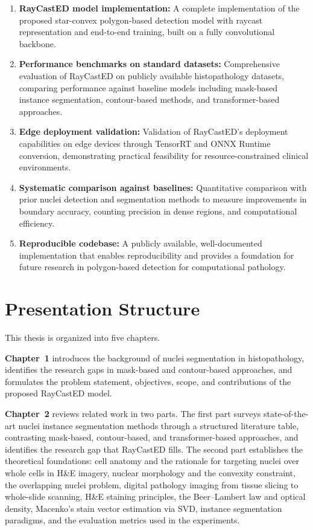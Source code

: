 \begin{enumerate}
	\item \textbf{RayCastED model implementation:} A complete implementation of the proposed star-convex polygon-based detection model with raycast representation and end-to-end training, built on a fully convolutional backbone.

	\item \textbf{Performance benchmarks on standard datasets:} Comprehensive evaluation of RayCastED on publicly available histopathology datasets, comparing performance against baseline models including mask-based instance segmentation, contour-based methods, and transformer-based approaches.

	\item \textbf{Edge deployment validation:} Validation of RayCastED's deployment capabilities on edge devices through TensorRT and ONNX Runtime conversion, demonstrating practical feasibility for resource-constrained clinical environments.

	\item \textbf{Systematic comparison against baselines:} Quantitative comparison with prior nuclei detection and segmentation methods to measure improvements in boundary accuracy, counting precision in dense regions, and computational efficiency.

	\item \textbf{Reproducible codebase:} A publicly available, well-documented implementation that enables reproducibility and provides a foundation for future research in polygon-based detection for computational pathology.
\end{enumerate}

\section{Presentation Structure}

This thesis is organized into five chapters.

\textbf{Chapter~1} introduces the background of nuclei segmentation in histopathology, identifies the research gaps in mask-based and contour-based approaches, and formulates the problem statement, objectives, scope, and contributions of the proposed RayCastED model.

\textbf{Chapter~2} reviews related work in two parts. The first part surveys state-of-the-art nuclei instance segmentation methods through a structured literature table, contrasting mask-based, contour-based, and transformer-based approaches, and identifies the research gap that RayCastED fills. The second part establishes the theoretical foundations: cell anatomy and the rationale for targeting nuclei over whole cells in H\&E imagery, nuclear morphology and the convexity constraint, the overlapping nuclei problem, digital pathology imaging from tissue slicing to whole-slide scanning, H\&E staining principles, the Beer--Lambert law and optical density, Macenko's stain vector estimation via SVD, instance segmentation paradigms, and the evaluation metrics used in the experiments.


